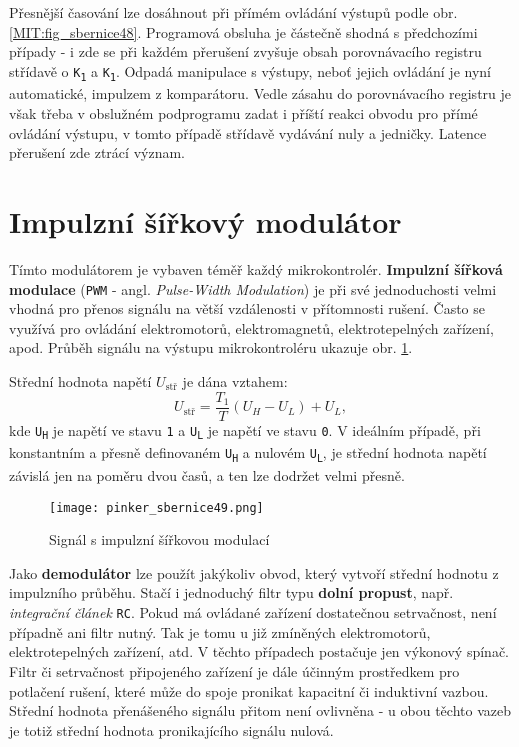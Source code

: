         Přesnější časování lze dosáhnout při přímém ovládání výstupů podle obr. 
        \ref{MIT:fig_sbernice48}. Programová obsluha je částečně shodná s předchozími případy - i 
        zde se při každém přerušení zvyšuje obsah porovnávacího registru střídavě o 
        \texttt{K\textsubscript{1}} a \texttt{K\textsubscript{1}}. Odpadá manipulace s výstupy, 
        neboť jejich ovládání je nyní automatické, impulzem z komparátoru. Vedle zásahu do 
        porovnávacího registru je však třeba v obslužném podprogramu zadat i příští reakci obvodu 
        pro přímé ovládání výstupu, v tomto případě střídavě vydávání nuly a jedničky. Latence 
        přerušení zde ztrácí význam.        
        
  \section{Impulzní šířkový modulátor}\label{ces:IchapIVsecVII}
    Tímto modulátorem je vybaven téměř každý mikrokontrolér. \textbf{Impulzní šířková modulace} 
    (\texttt{PWM} - angl. \emph{Pulse-Width Modulation}) je při své jednoduchosti velmi vhodná pro 
    přenos signálu na větší vzdálenosti v přítomnosti rušení. Často se využívá pro ovládání 
    elektromotorů, elektromagnetů, elektrotepelných zařízení, apod. Průběh signálu na výstupu 
    mikrokontroléru ukazuje obr. \ref{MIT:fig_sbernice49}.
 
    Střední hodnota napětí \(U_{\text{stř}}\)  je dána vztahem:
    \begin{equation}
      U_{\text{stř}} = \frac{T_1}{T}(U_H - U_L) + U_L,
    \end{equation}
    kde \texttt{U\textsubscript{H}} je napětí ve stavu \texttt{1} a \texttt{U\textsubscript{L}} je 
    napětí ve stavu \texttt{0}. V ideálním případě, při konstantním a přesně definovaném 
    \texttt{U\textsubscript{H}} a nulovém \texttt{U\textsubscript{L}}, je střední hodnota napětí 
    závislá jen na poměru dvou časů, a ten lze dodržet velmi přesně.

    \begin{figure}[ht!] %
      \centering
      \texttt{[image: pinker\_sbernice49.png]}
      \caption{Signál s impulzní šířkovou modulací}
      \label{MIT:fig_sbernice49}
    \end{figure}
    
    Jako \textbf{demodulátor} lze použít jakýkoliv obvod, který vytvoří střední hodnotu z 
    impulzního průběhu. Stačí i jednoduchý filtr typu \textbf{dolní propust}, např. 
    \emph{integrační článek} \texttt{RC}. Pokud má ovládané zařízení dostatečnou setrvačnost, není 
    případně ani filtr nutný. Tak je tomu u již zmíněných elektromotorů, elektrotepelných zařízení, 
    atd. V těchto případech postačuje jen výkonový spínač. Filtr či setrvačnost připojeného 
    zařízení je dále účinným prostředkem pro potlačení rušení, které může do spoje pronikat 
    kapacitní či induktivní vazbou. Střední hodnota přenášeného signálu přitom není ovlivněna - u 
    obou těchto vazeb je totiž střední hodnota pronikajícího signálu nulová.
    
